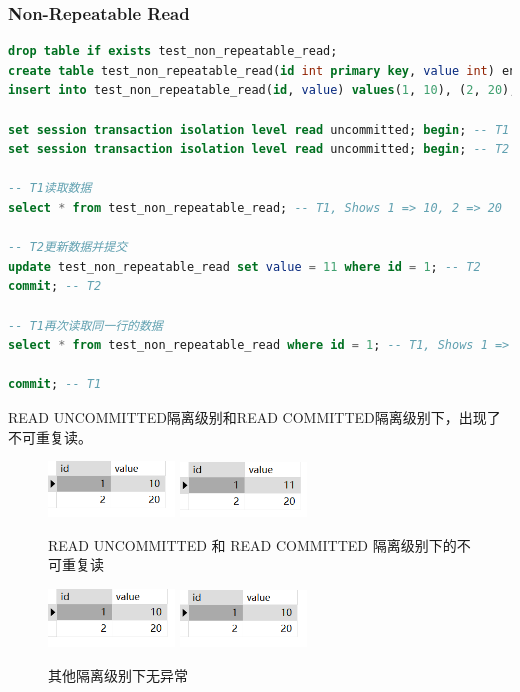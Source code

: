 \documentclass{article}
\begin{document}
\subsubsection{Non-Repeatable Read}

\begin{lstlisting}[language=sql]
drop table if exists test_non_repeatable_read;
create table test_non_repeatable_read(id int primary key, value int) engine=innodb;
insert into test_non_repeatable_read(id, value) values(1, 10), (2, 20);

set session transaction isolation level read uncommitted; begin; -- T1
set session transaction isolation level read uncommitted; begin; -- T2

-- T1读取数据
select * from test_non_repeatable_read; -- T1, Shows 1 => 10, 2 => 20

-- T2更新数据并提交
update test_non_repeatable_read set value = 11 where id = 1; -- T2
commit; -- T2

-- T1再次读取同一行的数据
select * from test_non_repeatable_read where id = 1; -- T1, Shows 1 => 11

commit; -- T1
\end{lstlisting}

READ UNCOMMITTED隔离级别和READ COMMITTED隔离级别下，出现了不可重复读。

\begin{figure}[H]
\centering
\includegraphics[width=0.3\textwidth]{img/52.png}
\includegraphics[width=0.3\textwidth]{img/53.png}
\caption{READ UNCOMMITTED 和 READ COMMITTED 隔离级别下的不可重复读}
\end{figure}

\begin{figure}[H]
\centering
\includegraphics[width=0.3\textwidth]{img/54.png}
\includegraphics[width=0.3\textwidth]{img/55.png}
\caption{其他隔离级别下无异常}
\end{figure}
\end{document}
